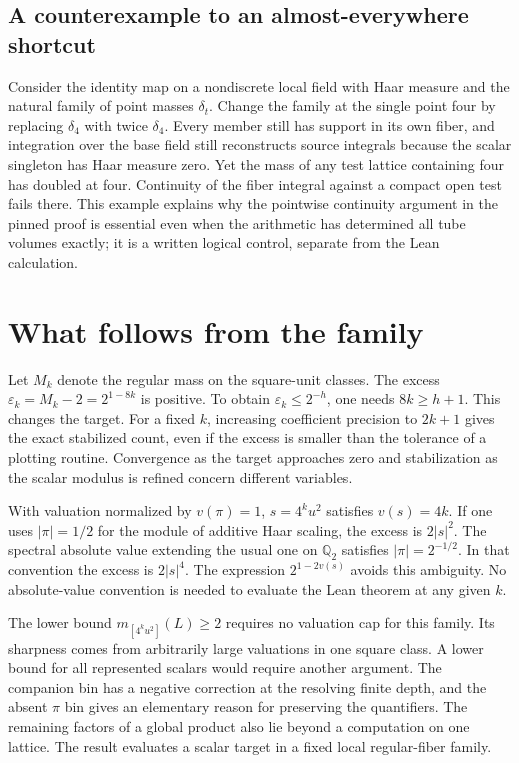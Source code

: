 \documentclass[12pt,letterpaper]{article}
\begin{document}
\subsection{A counterexample to an almost-everywhere shortcut}
Consider the identity map on a nondiscrete local field with Haar measure and the natural family of point masses $\delta_t$. Change the family at the single point four by replacing $\delta_4$ with twice $\delta_4$. Every member still has support in its own fiber, and integration over the base field still reconstructs source integrals because the scalar singleton has Haar measure zero. Yet the mass of any test lattice containing four has doubled at four. Continuity of the fiber integral against a compact open test fails there. This example explains why the pointwise continuity argument in the pinned proof is essential even when the arithmetic has determined all tube volumes exactly; it is a written logical control, separate from the Lean calculation.
\section{What follows from the family}
Let $M_k$ denote the regular mass on the square-unit classes. The excess $\varepsilon_k=M_k-2=2^{1-8k}$ is positive. To obtain $\varepsilon_k\le2^{-h}$, one needs $8k\ge h+1$. This changes the target. For a fixed $k$, increasing coefficient precision to $2k+1$ gives the exact stabilized count, even if the excess is smaller than the tolerance of a plotting routine. Convergence as the target approaches zero and stabilization as the scalar modulus is refined concern different variables.

With valuation normalized by $v(\pi)=1$, $s=4^ku^2$ satisfies $v(s)=4k$. If one uses $|\pi|=1/2$ for the module of additive Haar scaling, the excess is $2|s|^2$. The spectral absolute value extending the usual one on $\mathbb Q_2$ satisfies $|\pi|=2^{-1/2}$. In that convention the excess is $2|s|^4$. The expression $2^{1-2v(s)}$ avoids this ambiguity. No absolute-value convention is needed to evaluate the Lean theorem at any given $k$.

The lower bound $m_{[4^ku^2]}(L)\ge2$ requires no valuation cap for this family. Its sharpness comes from arbitrarily large valuations in one square class. A lower bound for all represented scalars would require another argument. The companion bin has a negative correction at the resolving finite depth, and the absent $\pi$ bin gives an elementary reason for preserving the quantifiers. The remaining factors of a global product also lie beyond a computation on one lattice. The result evaluates a scalar target in a fixed local regular-fiber family.
\end{document}
